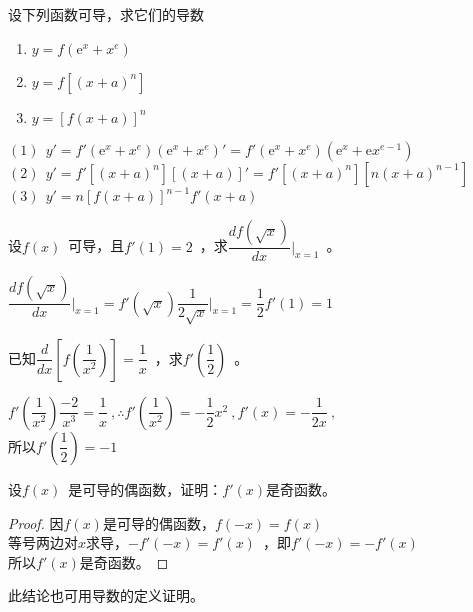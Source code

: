 \begin{example}
设下列函数可导，求它们的导数
\begin{enumerate}[(1)]
\item $y=f\left(\mathrm{e}^x+x^e\right)$
\item $y=f\left[\left(x+a\right)^n\right]$
\item $y=\left[f\left(x+a\right)\right]^n$
\end{enumerate}
\end{example}
\begin{solution}
$(1)~~y'=f'\left(\mathrm{e}^x+x^e\right)\left(\mathrm{e}^x+x^e\right)'=f'\left(\mathrm{e}^x+x^e\right)\left(\mathrm{e}^x+\mathrm{e}x^{e-1}\right)$\\
$(2)~~y'=f'\left[\left(x+a\right)^n\right]\left[\left(x+a\right)\right]'=f'\left[\left(x+a\right)^n\right]\left[n\left(x+a\right)^{n-1}\right]$\\
$(3)~~y'=n\left[f\left(x+a\right)\right]^{n-1}f'\left(x+a\right)$
\end{solution}
\begin{example}
设$f(x)$~可导，且$f'(1)=2$~，求$\dfrac{df\left(\sqrt{x}\right)}{dx}\bigg|_{x=1}$~。
\end{example}
\begin{solution}
$\dfrac{df\left(\sqrt{x}\right)}{dx}\bigg|_{x=1}=f'\left(\sqrt{x}\right)\dfrac{1}{2\sqrt{x}}\big|_{x=1}=\dfrac{1}{2}f'(1)=1$
\end{solution}
\begin{example}
已知$\dfrac{d}{dx}\left[f\left(\dfrac{1}{x^2}\right)\right]=\dfrac{1}{x}$~，求$f'\left(\dfrac{1}{2}\right)$~。
\end{example}
\begin{solution}
$f'\left(\dfrac{1}{x^2}\right)\dfrac{-2}{x^3}=\dfrac{1}{x}~,\therefore f'\left(\dfrac{1}{x^2}\right)=-\dfrac{1}{2}x^2~,f'\left(x\right)=-\dfrac{1}{2x}~,$\\
所以$f'\left(\dfrac{1}{2}\right)=-1$
\end{solution}
\begin{example}
设$f(x)$~是可导的偶函数，证明：$f'(x)$是奇函数。
\end{example}
\begin{proof}
因$f(x)$是可导的偶函数，$f(-x)=f(x)$\\
等号两边对$x$求导，$-f'(-x)=f'(x)$~，即$f'(-x)=-f'(x)$\\
所以$f'(x)$是奇函数。
\end{proof}
此结论也可用导数的定义证明。
